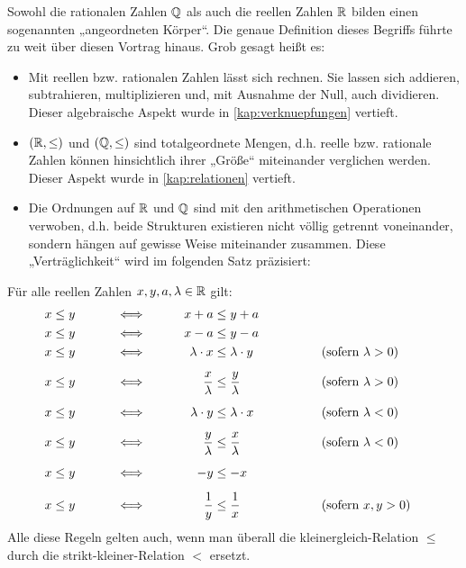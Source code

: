 \begin{bem}
    Sowohl die rationalen Zahlen $\mathbb Q$ als auch die reellen Zahlen $\mathbb R$ bilden einen sogenannten „angeordneten Körper“. Die genaue Definition dieses Begriffs führte zu weit über diesen Vortrag hinaus. Grob gesagt heißt es:
    \begin{itemize}
        \item Mit reellen bzw. rationalen Zahlen lässt sich rechnen. Sie lassen sich addieren, subtrahieren, multiplizieren und, mit Ausnahme der Null, auch dividieren. Dieser algebraische Aspekt wurde in \cref{kap:verknuepfungen} vertieft.
        \item $(\mathbb R,\le)$ und $(\mathbb Q,\le)$ sind totalgeordnete Mengen, d.h. reelle bzw. rationale Zahlen können hinsichtlich ihrer „Größe“ miteinander verglichen werden. Dieser Aspekt wurde in \cref{kap:relationen} vertieft.
        \item Die Ordnungen auf $\mathbb R$ und $\mathbb Q$ sind mit den arithmetischen Operationen verwoben, d.h. beide Strukturen existieren nicht völlig getrennt voneinander, sondern hängen auf gewisse Weise miteinander zusammen. Diese „Verträglichkeit“ wird im folgenden Satz präzisiert:
    \end{itemize}
\end{bem}


\begin{satz} \label{ungleichungregeln}
    Für alle reellen Zahlen $x,y,a,\lambda\in \mathbb R$ gilt:
    \begingroup
    \allowdisplaybreaks
    \begin{alignat*}{4}
        x&\le y &\qquad&\iff&\qquad x+a&\le y+a \\
        x&\le y &\qquad&\iff&\qquad x-a&\le y-a \\
        x&\le y &\qquad&\iff&\qquad \lambda \cdot x&\le \lambda \cdot y &\qquad&\qquad (\textnormal{sofern $\lambda>0$}) \\[0.5em]
        x&\le y &\qquad&\iff&\qquad \frac{x}{\lambda} &\le \frac{y}{\lambda} &\qquad&\qquad (\textnormal{sofern $\lambda>0$}) \\[0.5em]
        x&\le y &\qquad&\iff&\qquad \lambda \cdot y&\le \lambda \cdot x &\qquad&\qquad (\textnormal{sofern $\lambda<0$}) \\[0.5em]
        x&\le y &\qquad&\iff&\qquad \frac{y}{\lambda} &\le \frac{x}{\lambda} &\qquad&\qquad (\textnormal{sofern $\lambda<0$}) \\[0.5em]
        x&\le y &\qquad &\iff&\qquad -y&\le -x \\[0.5em]
        x&\le y &\qquad&\iff&\qquad \frac{1}{y} & \le\frac{1}{x} &\qquad&\qquad (\textnormal{sofern $x,y>0$})
    \end{alignat*}
    \endgroup
    Alle diese Regeln gelten auch, wenn man überall die kleinergleich-Relation $\le$ durch die strikt-kleiner-Relation $<$ ersetzt.
\end{satz}



